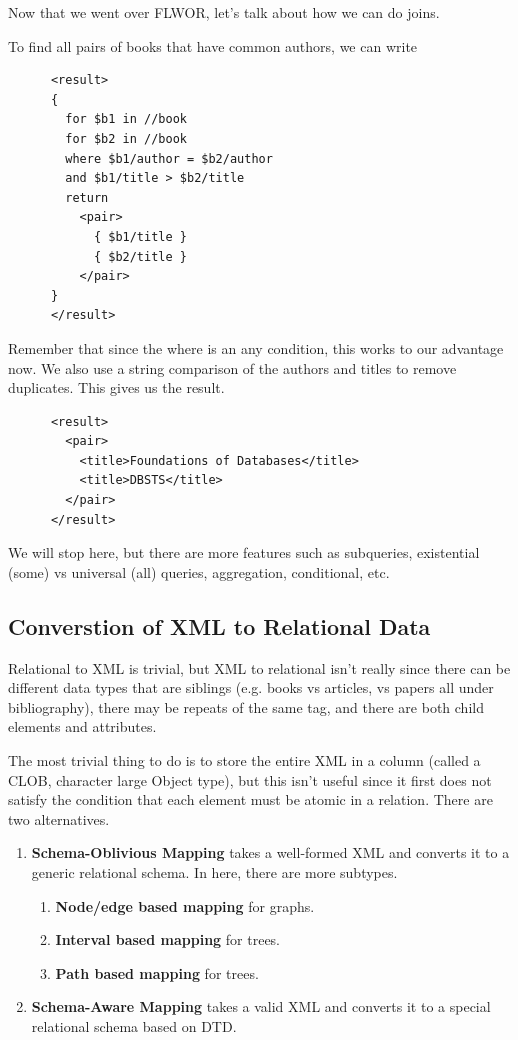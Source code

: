   Now that we went over FLWOR, let's talk about how we can do joins. 

  \begin{example}
    To find all pairs of books that have common authors, we can write 
    \begin{lstlisting}
      <result>
      {
        for $b1 in //book
        for $b2 in //book
        where $b1/author = $b2/author
        and $b1/title > $b2/title
        return
          <pair>
            { $b1/title }
            { $b2/title }
          </pair>
      }
      </result> 
    \end{lstlisting}
    Remember that since the where is an any condition, this works to our advantage now. We also use a string comparison of the authors and titles to remove duplicates. This gives us the result. 
    \begin{lstlisting}
      <result>
        <pair>
          <title>Foundations of Databases</title>
          <title>DBSTS</title>
        </pair>
      </result> 
    \end{lstlisting}
  \end{example}

  We will stop here, but there are more features such as subqueries, existential (some) vs universal (all) queries, aggregation, conditional, etc. 

\subsection{Converstion of XML to Relational Data} 
  
  Relational to XML is trivial, but XML to relational isn't really since there can be different data types that are siblings (e.g. books vs articles, vs papers all under bibliography), there may be repeats of the same tag, and there are both child elements and attributes. 
  
  The most trivial thing to do is to store the entire XML in a column (called a CLOB, character large Object type), but this isn't useful since it first does not satisfy the condition that each element must be atomic in a relation. There are two alternatives. 
  \begin{enumerate}
    \item \textbf{Schema-Oblivious Mapping} takes a well-formed XML and converts it to a generic relational schema. In here, there are more subtypes. 
      \begin{enumerate}
        \item \textbf{Node/edge based mapping} for graphs. 
        \item \textbf{Interval based mapping} for trees.
        \item \textbf{Path based mapping} for trees. 
      \end{enumerate}
    \item \textbf{Schema-Aware Mapping} takes a valid XML and converts it to a special relational schema based on DTD. 
  \end{enumerate} 

